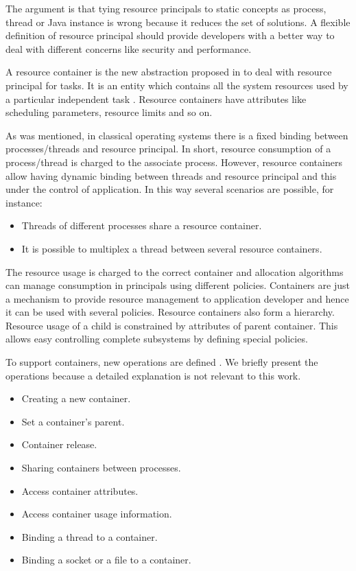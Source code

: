 The argument is that tying resource principals to static concepts as process, thread or Java instance is wrong because it reduces the set of solutions.
A flexible definition of resource principal should provide developers with a better way to deal with different concerns like security and performance.

A resource container is the new abstraction proposed in \cite{Banga:1999:RCN:296806.296810} to deal with resource principal for tasks. It is an entity which contains all the system resources used by a particular independent task \cite{Banga:1999:RCN:296806.296810}. Resource containers have attributes like scheduling parameters, resource limits and so on.

As was mentioned, in classical operating systems there is a fixed binding between processes/threads and resource principal.
In short, resource consumption of a process/thread is charged to the associate process.
However, resource containers allow having dynamic binding between threads and resource principal and this under the control of application.
In this way several scenarios are possible, for instance:
\begin{itemize}
\item Threads of different processes share a resource container.
\item It is possible to multiplex a thread between several resource containers.
\end{itemize}
The resource usage is charged to the correct container and allocation algorithms can manage consumption in principals using different policies.
Containers are just a mechanism to provide resource management to application developer and hence it can be used with several policies.
Resource containers also form a hierarchy.
Resource usage of a child is constrained by attributes of parent container.
This allows easy controlling complete subsystems by defining special policies.

To support containers, new operations are defined \cite{Banga:1999:RCN:296806.296810}. We briefly present the operations because a detailed explanation is not relevant to this work.
\begin{itemize}
\item Creating a new container.
\item Set a container's parent.
\item Container release.
\item Sharing containers between processes.
\item Access container attributes.
\item Access container usage information.
\item Binding a thread to a container.
\item Binding a socket or a file to a container.
\end{itemize}

